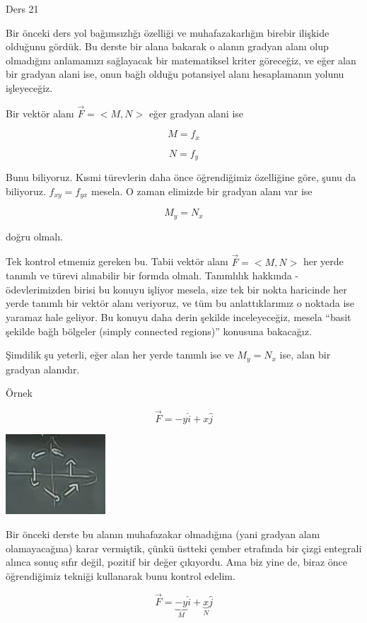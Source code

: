 \documentclass[12pt,fleqn]{article}\usepackage{../../common}
\begin{document}
Ders 21

Bir önceki ders yol bağımsızlığı özelliği ve muhafazakarlığın birebir ilişkide
olduğunu gördük. Bu derste bir alana bakarak o alanın gradyan alanı olup
olmadığını anlamamızı sağlayacak bir matematiksel kriter göreceğiz, ve eğer alan
bir gradyan alani ise, onun bağlı olduğu potansiyel alanı hesaplamanın yolunu
işleyeceğiz.

Bir vektör alanı $\vec{F} = < M,N >$ eğer gradyan alani ise 

$$ M = f_x $$

$$ N = f_y $$

Bunu biliyoruz. Kısmi türevlerin daha önce öğrendiğimiz özelliğine göre, şunu da
biliyoruz. $f_{xy} = f_{yx}$ mesela. O zaman elimizde bir gradyan alanı var ise

$$ M_y = N_x $$

doğru olmalı. 

Tek kontrol etmemiz gereken bu. Tabii vektör alanı $\vec{F} = < M,N >$ her yerde
tanımlı ve türevi alınabilir bir formda olmalı. Tanımlılık hakkında -
ödevlerimizden birisi bu konuyu işliyor mesela, size tek bir nokta haricinde her
yerde tanımlı bir vektör alanı veriyoruz, ve tüm bu anlattıklarımız o noktada
ise yaramaz hale geliyor. Bu konuyu daha derin şekilde inceleyeceğiz, mesela
``basit şekilde bağlı bölgeler (simply connected regions)'' konusuna bakacağız.

Şimdilik şu yeterli, eğer alan her yerde tanımlı ise ve $M_y = N_x$ ise,
alan bir gradyan alanıdır. 

Örnek 

$$ \vec{F} = -y\hat{i} + x\hat{j} $$

\begin{center}
\includegraphics[height=3cm]{21_1.png}
\end{center}

Bir önceki derste bu alanın muhafazakar olmadığına (yani gradyan alanı
olamayacağına) karar vermiştik, çünkü üstteki çember etrafında bir çizgi
entegrali alınca sonuç sıfır değil, pozitif bir değer çıkıyordu. Ama biz yine
de, biraz önce öğrendiğimiz tekniği kullanarak bunu kontrol edelim.

$$ \vec{F} = \underbrace{-y}_{M}\hat{i} + 
\underbrace{x}_{N}\hat{j} 
$$
\end{document}

